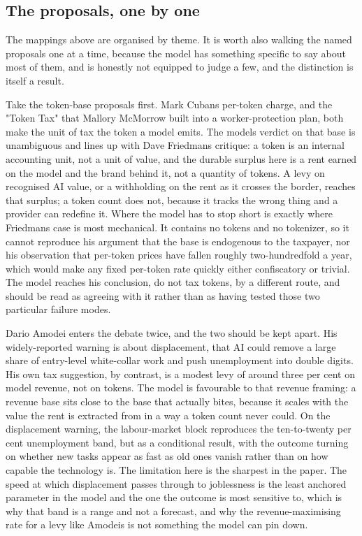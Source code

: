\documentclass[12pt]{article}
\begin{document}
\hypertarget{the-proposals-one-by-one}{%
\subsection{The proposals, one by one}\label{the-proposals-one-by-one}}

The mappings above are organised by theme. It is worth also walking the
named proposals one at a time, because the model has something specific
to say about most of them, and is honestly not equipped to judge a few,
and the distinction is itself a result.

Take the token-base proposals first. Mark Cuban\textquotesingle s
per-token charge, and the "Token Tax" that Mallory McMorrow built into a
worker-protection plan, both make the unit of tax the token a model
emits. The model\textquotesingle s verdict on that base is unambiguous
and lines up with Dave Friedman\textquotesingle s critique: a token is
an internal accounting unit, not a unit of value, and the durable
surplus here is a rent earned on the model and the brand behind it, not
a quantity of tokens. A levy on recognised AI value, or a withholding on
the rent as it crosses the border, reaches that surplus; a token count
does not, because it tracks the wrong thing and a provider can redefine
it. Where the model has to stop short is exactly where
Friedman\textquotesingle s case is most mechanical. It contains no
tokens and no tokenizer, so it cannot reproduce his argument that the
base is endogenous to the taxpayer, nor his observation that per-token
prices have fallen roughly two-hundredfold a year, which would make any
fixed per-token rate quickly either confiscatory or trivial. The model
reaches his conclusion, do not tax tokens, by a different route, and
should be read as agreeing with it rather than as having tested those
two particular failure modes.

Dario Amodei enters the debate twice, and the two should be kept apart.
His widely-reported warning is about displacement, that AI could remove
a large share of entry-level white-collar work and push unemployment
into double digits. His own tax suggestion, by contrast, is a modest
levy of around three per cent on model revenue, not on tokens. The model
is favourable to that revenue framing: a revenue base sits close to the
base that actually bites, because it scales with the value the rent is
extracted from in a way a token count never could. On the displacement
warning, the labour-market block reproduces the ten-to-twenty per cent
unemployment band, but as a conditional result, with the outcome turning
on whether new tasks appear as fast as old ones vanish rather than on
how capable the technology is. The limitation here is the sharpest in
the paper. The speed at which displacement passes through to joblessness
is the least anchored parameter in the model and the one the outcome is
most sensitive to, which is why that band is a range and not a forecast,
and why the revenue-maximising rate for a levy like
Amodei\textquotesingle s is not something the model can pin down.
\end{document}
